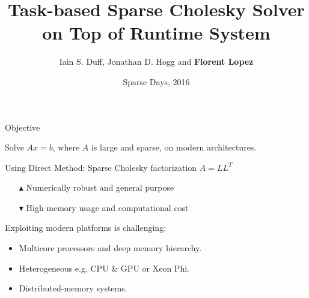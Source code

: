 \documentclass[unknownkeysallowed]{beamer}
\author{Iain S. Duff, Jonathan D. Hogg and {\bf Florent Lopez}}
\institute{Rutherford Appleton Laboratory
  \\ \alert{NLAFET Project}}
\title{Task-based Sparse Cholesky Solver on Top of Runtime System}
\date{Sparse Days, 2016}
\newcommand{\dg}[1]{\textcolor{mgreen}{#1\xspace}}
\newcommand{\dr}[1]{\textcolor{mred}{#1\xspace}}
\newcommand{\db}[1]{\textcolor{mblue}{#1\xspace}}
\begin{document}
\begin{frame}[t,plain]
\titlepage
\end{frame}

\begin{frame}{Objective}

  Solve \alert{$Ax=b$}, where $A$ is \db{large} and \db{sparse}, on
  modern architectures.

  \vspace{0.5cm}
  
  Using \db{Direct Method}: Sparse Cholesky factorization $A=LL^{T}$
  \begin{itemize}
  \item[\dg{$\blacktriangle$}] Numerically robust and general purpose
  \item[\dr{$\blacktriangledown$}] High memory usage and computational cost
  \end{itemize}

  \vspace{0.5cm}

  Exploiting modern platforms is challenging:
  \begin{itemize}
  \item \db{Multicore} processors and deep \db{memory hierarchy}.
  \item \db{Heterogeneous} e.g. CPU \& GPU or Xeon Phi.
  \item \db{Distributed-memory} systems. 
  \end{itemize}

\end{frame}
\end{document}
